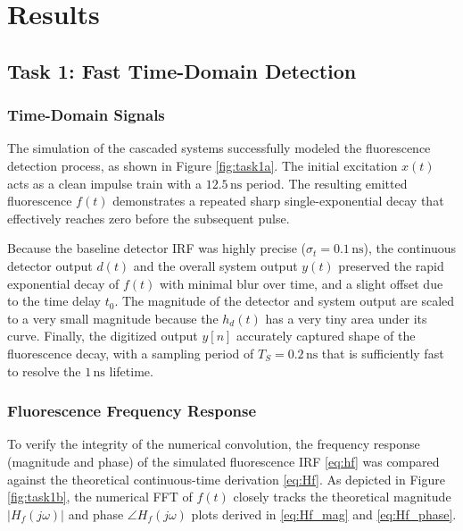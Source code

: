 \documentclass[conference]{IEEEtran}
\begin{document}
\section{Results}

\subsection{Task 1: Fast Time-Domain Detection}

\subsubsection{Time-Domain Signals}
The simulation of the cascaded systems successfully modeled the fluorescence detection process, as shown in Figure \ref{fig:task1a}.
The initial excitation $x(t)$ acts as a clean impulse train with a $12.5\,\text{ns}$ period.
The resulting emitted fluorescence $f(t)$ demonstrates a repeated sharp single-exponential decay that effectively reaches zero before the subsequent pulse.

Because the baseline detector IRF was highly precise ($\sigma_t = 0.1\,\text{ns}$),
the continuous detector output $d(t)$ and the overall system output $y(t)$ preserved the rapid exponential decay of $f(t)$ with minimal blur over time, and a slight offset due to the time delay $t_0$.
The magnitude of the detector and system output are scaled to a very small magnitude because the $h_d(t)$ has a very tiny area under its curve.
Finally, the digitized output $y[n]$ accurately captured shape of the fluorescence decay, with a sampling period of $T_S = 0.2\,\text{ns}$ that is sufficiently fast to resolve the $1\,\text{ns}$ lifetime.


\subsubsection{Fluorescence Frequency Response}
To verify the integrity of the numerical convolution, the frequency response (magnitude and phase) of the simulated fluorescence IRF \eqref{eq:hf} was compared against the theoretical continuous-time derivation \eqref{eq:Hf}.
As depicted in Figure \ref{fig:task1b}, the numerical FFT of $f(t)$ closely tracks the theoretical magnitude $|H_f(j\omega)|$ and phase $\angle H_f(j\omega)$ plots derived
in \eqref{eq:Hf_mag} and \eqref{eq:Hf_phase}. 
\end{document}
